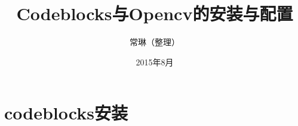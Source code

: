 \documentclass[12pt]{article}
\begin{document}
\title{\vspace{-2em}Codeblocks与Opencv的安装与配置\vspace{-0.7em}}
\author{常琳（整理）}
\date{\vspace{-0.7em}2015年8月\vspace{-0.7em}}
\maketitle\thispagestyle{fancy}
\maketitle
\tableofcontents 

\section{codeblocks安装}
\end{document}
